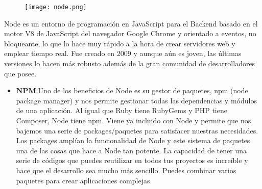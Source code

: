 \begin{figure}[H]
    \centering
    \texttt{[image: node.png]}

\end{figure}
Node es un entorno de programación en JavaScript para el Backend basado en el motor V8 de JavaScript del navegador Google Chrome y orientado a eventos, no bloqueante, lo que lo hace muy rápido a la hora de crear servidores web y emplear tiempo real. Fue creado en 2009 y aunque aún es joven, las últimas versiones lo hacen más robusto además de la gran comunidad de desarrolladores que posee.

\begin{itemize}
\item \textbf{NPM}.Uno de los beneficios de Node es su gestor de paquetes, npm (node package manager) y nos permite gestionar todas las dependencias y módulos de una aplicación. Al igual que Ruby tiene RubyGems y PHP tiene Composer, Node tiene npm.
Viene ya incluido con Node y permite que nos bajemos una serie de packages/paquetes para satisfacer nuestras necesidades. Los packages amplían la funcionalidad de Node y este sistema de paquetes una de las cosas que hace a Node tan potente.
La capacidad de tener una serie de códigos que puedes reutilizar en todos tus proyectos es increíble y hace que el desarrollo sea mucho más sencillo. Puedes combinar varios paquetes para crear aplicaciones complejas.
\end{itemize}

